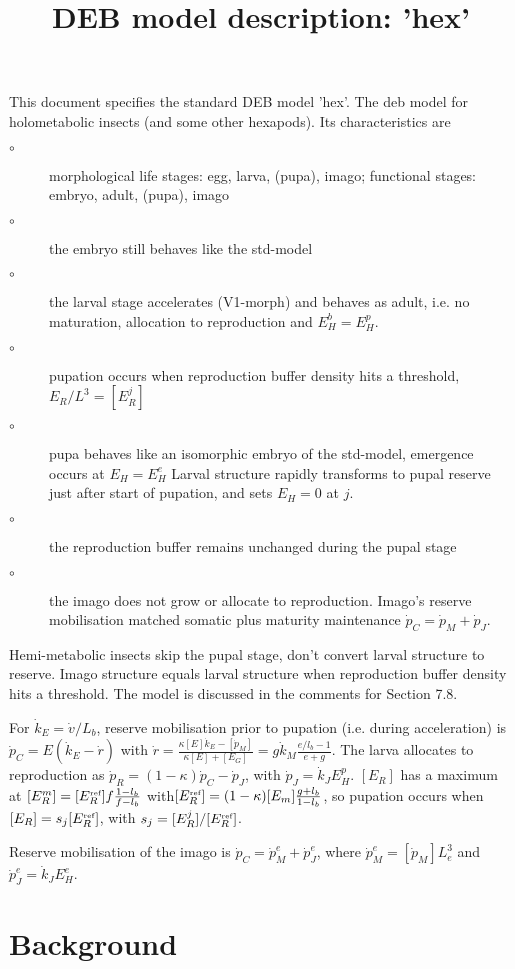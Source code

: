 \documentclass{article}
\title{DEB model description: 'hex'}
\begin{document}
\maketitle

This document specifies the standard DEB model 'hex'.
The {\sc deb} model for holometabolic insects (and some other hexapods). Its characteristics are
\begin{description}
  \item[$\circ$] morphological life stages: egg, larva, (pupa), imago; functional stages: embryo, adult, (pupa), imago
	
  \item[$\circ$] the embryo still behaves like the std-model
	
  \item[$\circ$] the larval stage accelerates (V1-morph) and behaves as adult, i.e. no maturation, allocation to reproduction and $E_H^b = E_H^p$.
	
  \item[$\circ$] pupation occurs when reproduction buffer density hits a threshold, $E_R/ L^3 = [E_R^j]$
	
  \item[$\circ$] pupa behaves like an isomorphic embryo of the std-model, emergence occurs at $E_H = E_H^e$
	  Larval structure rapidly transforms to pupal reserve just after start of pupation, and sets $E_H = 0$ at $j$.
		
  \item[$\circ$] the reproduction buffer remains unchanged during the pupal stage
	
  \item[$\circ$] the imago does not grow or allocate to reproduction. 
	  Imago's reserve mobilisation matched somatic plus maturity maintenance $\dot{p}_C = \dot{p}_M + \dot{p}_J$.
\end{description}
Hemi-metabolic insects skip the pupal stage, don't convert larval structure to reserve. 
Imago structure equals larval structure when reproduction buffer density hits a threshold.
The model is discussed in the comments for Section 7.8.

For $\dot{k}_E = \dot{v}/ L_b$, reserve mobilisation prior to pupation (i.e. during acceleration) is $\dot{p}_C = E (\dot{k}_E - \dot{r})$ 
  with $\dot{r} = \frac{\kappa [E] \dot{k}_E - [\dot{p}_M]} {\kappa [E] + [E_G]} = g \dot{k}_M \frac{e/ l_b - 1} {e + g}$.
The larva allocates to reproduction as $\dot{p}_R = (1- \kappa) \dot{p}_C - \dot{p}_J$, with $\dot{p}_J = \dot{k}_J E_H^p$.
$[E_R]$ has a maximum at $[E_R^m] = [E_R^{\mbox{\tiny ref}}] f \frac{1 - l_b} {f - l_b}$ with$[E_R^{\mbox{\tiny ref}}] = (1 - \kappa) [E_m] \frac{g + l_b} {1 - l_b}$, so pupation occurs when $[E_R] = s_j [E_R^{\mbox{\tiny ref}}]$, with $s_j = [E_R^j]/ [E_R^{\mbox{\tiny ref}}]$.

Reserve mobilisation of the imago is $\dot{p}_C = \dot{p}_M^e + \dot{p}_J^e$, where $\dot{p}_M^e = [\dot{p}_M] L_e^3$ and $\dot{p}_J^e = \dot{k}_J E_H^e$.


\section{Background}







\end{document}
